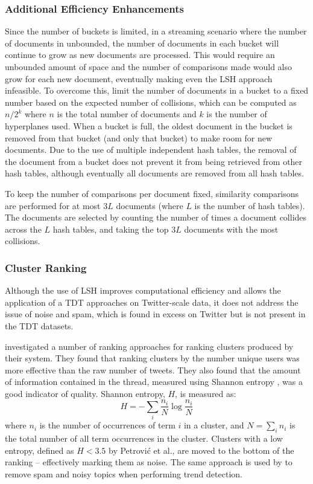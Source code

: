 \subsubsection{Additional Efficiency Enhancements}
Since the number of buckets is limited, in a streaming scenario where the number of documents in unbounded, the number of documents in each bucket will continue to grow as new documents are processed.
This would require an unbounded amount of space and the number of comparisons made would also grow for each new document, eventually making even the LSH approach infeasible.
To overcome this, \cite{Petrovic:2010:SFS:1857999.1858020} limit the number of documents in a bucket to a fixed number based on the expected number of collisions, which can be computed as $n/2^k$ where $n$ is the total number of documents and $k$ is the number of hyperplanes used.
When a bucket is full, the oldest document in the bucket is removed from that bucket (and only that bucket) to make room for new documents.
Due to the use of multiple independent hash tables, the removal of the document from a bucket does not prevent it from being retrieved from other hash tables, although eventually all documents are removed from all hash tables.

To keep the number of comparisons per document fixed, similarity comparisons are performed for at most $3L$ documents (where $L$ is the number of hash tables).
The documents are selected by counting the number of times a document collides across the $L$ hash tables, and taking the top $3L$ documents with the most collisions.

\subsubsection{Cluster Ranking}
Although the use of LSH improves computational efficiency and allows the application of a TDT approaches on Twitter-scale data, it does not address the issue of noise and spam, which is found in excess on Twitter but is not present in the TDT datasets.

\cite{Petrovic:2010:SFS:1857999.1858020} investigated a number of ranking approaches for ranking clusters produced by their system.
They found that ranking clusters by the number unique users was more effective than the raw number of tweets.
They also found that the amount of information contained in the thread, measured using Shannon entropy \citep{Shannon:2001:MTC:584091.584093}, was a good indicator of quality.
Shannon entropy, $H$, is measured as:
\begin{displaymath}
	H = -\sum_i{\frac{n_i}{N} \log \frac{n_i}{N}}
\end{displaymath}
where $n_i$ is the number of occurrences of term $i$ in a cluster,	and $N = \sum_i{n_i}$ is the total number of all term occurrences in the cluster.
Clusters with a low entropy, defined as $H < 3.5$ by Petrović et al., are moved to the bottom of the ranking -- effectively marking them as noise.
The same approach is used by \cite{benhardus2013streaming} to remove spam and noisy topics when performing trend detection.

